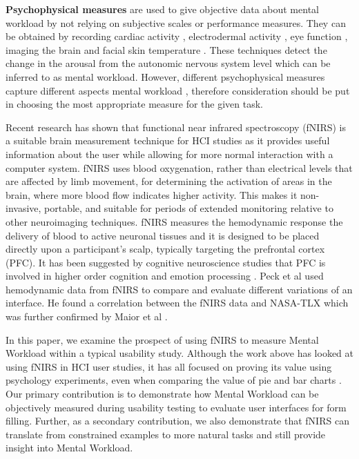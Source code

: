 \documentclass[../main/Feedback.tex]{subfiles}
\begin{document}
\textbf{Psychophysical measures} are used to give objective data about mental workload by not relying on subjective scales or performance measures.
They can be obtained by recording cardiac activity \cite{backs1994metabolic}, electrodermal activity \cite{collet2014measuring}, eye function \cite{beatty1982task}, imaging the brain \cite{balconi2015hemodynamic} and facial skin temperature \cite{stemberger2010thermal}.
These techniques detect the  change in the arousal from the autonomic nervous system level which can be inferred to as mental workload.
However, different psychophysical measures capture different aspects mental workload \cite{cain2007review}, therefore consideration should be put in choosing the most appropriate measure for the given task.

Recent research has shown that functional near infrared spectroscopy (fNIRS) is a suitable brain measurement technique for HCI studies \cite{maior2015examining,solovey2009using,pike2014measuring} as it provides useful information about the user while allowing for more normal interaction with a computer system.
fNIRS uses blood oxygenation, rather than electrical levels that are affected by limb movement, for determining the activation of areas in the brain, where more blood flow indicates higher activity.
This makes it non-invasive, portable, and suitable for periods of extended monitoring relative to other neuroimaging techniques.
fNIRS measures the hemodynamic response the delivery of blood to active neuronal tissues and it is designed to be placed directly upon a participant's scalp, typically targeting the prefrontal cortex (PFC).
It has been suggested by cognitive neuroscience studies that PFC is involved in higher order cognition \cite{braver1997parametric} and emotion processing \cite{damasio1996somatic}. Peck et al \cite{peck2013using} used hemodynamic data from fNIRS to compare and evaluate different variations of an interface.
He found a correlation between the fNIRS data and NASA-TLX which was further confirmed by Maior et al \cite{maior2014continuous}. 

In this paper, we examine the prospect of using fNIRS to measure Mental Workload within a typical usability study. Although the work above has looked at using fNIRS in HCI user studies, it has all focused on proving its value using psychology experiments, even when comparing the value of pie and bar charts \cite{peck2013using}. Our primary contribution is to demonstrate how Mental Workload can be objectively measured during usability testing to evaluate user interfaces for form filling. Further, as a secondary contribution, we also demonstrate that fNIRS can translate from constrained examples to more natural tasks and still provide insight into Mental Workload.
\end{document}
